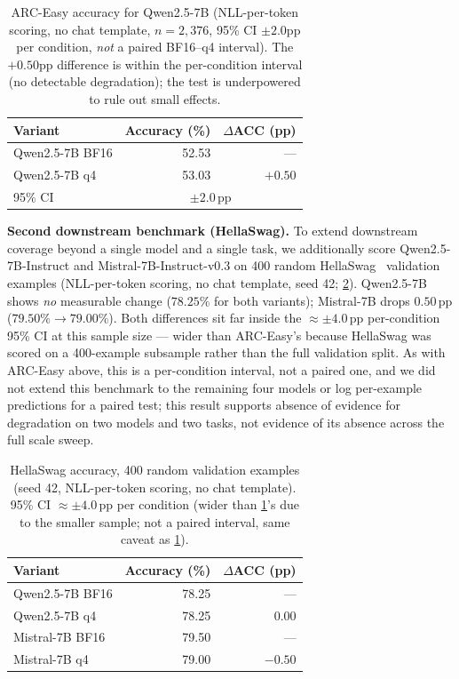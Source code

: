 \documentclass[10pt,twocolumn]{article}
\begin{document}
\begin{table}[t]
  \centering
  \caption{ARC-Easy accuracy for Qwen2.5-7B (NLL-per-token scoring, no chat
    template, $n=2{,}376$, 95\% CI $\pm2.0$pp per condition, \emph{not} a
    paired BF16--q4 interval).  The $+0.50$pp difference
    is within the per-condition interval (no detectable degradation); the test
    is underpowered to rule out small effects.}
  \label{tab:arc}
  \begin{tabular}{lrr}
    \toprule
    Variant & Accuracy (\%) & $\Delta$ACC (pp) \\
    \midrule
    Qwen2.5-7B BF16 & 52.53 & --- \\
    Qwen2.5-7B q4   & 53.03 & $+0.50$ \\
    \midrule
    95\% CI         & \multicolumn{2}{c}{$\pm2.0$\,pp} \\
    \bottomrule
  \end{tabular}
\end{table}

\textbf{Second downstream benchmark (HellaSwag).}  To extend downstream
coverage beyond a single model and a single task, we additionally score
Qwen2.5-7B-Instruct and Mistral-7B-Instruct-v0.3 on 400 random
HellaSwag~\citep{zellers2019hellaswag} validation examples (NLL-per-token
scoring, no chat template, seed 42; \cref{tab:hellaswag}).  Qwen2.5-7B shows
\emph{no} measurable change ($78.25\%$ for both variants); Mistral-7B drops
$0.50$\,pp ($79.50\%\to79.00\%$).  Both differences sit far inside the
$\approx\pm4.0$\,pp per-condition 95\% CI at this sample size --- wider than
ARC-Easy's because HellaSwag was scored on a 400-example subsample rather
than the full validation split.  As with ARC-Easy above, this is a
per-condition interval, not a paired one, and we did not extend this
benchmark to the remaining four models or log per-example predictions for a
paired test; this result supports absence of evidence for degradation on two
models and two tasks, not evidence of its absence across the full scale
sweep.

\begin{table}[t]
  \centering
  \caption{HellaSwag accuracy, 400 random validation examples (seed 42,
    NLL-per-token scoring, no chat template).  95\% CI $\approx\pm4.0$\,pp
    per condition (wider than \cref{tab:arc}'s due to the smaller sample;
    not a paired interval, same caveat as \cref{tab:arc}).}
  \label{tab:hellaswag}
  \begin{tabular}{lrr}
    \toprule
    Variant & Accuracy (\%) & $\Delta$ACC (pp) \\
    \midrule
    Qwen2.5-7B BF16 & 78.25 & --- \\
    Qwen2.5-7B q4   & 78.25 & $0.00$ \\
    \midrule
    Mistral-7B BF16 & 79.50 & --- \\
    Mistral-7B q4   & 79.00 & $-0.50$ \\
    \bottomrule
  \end{tabular}
\end{table}
\end{document}
